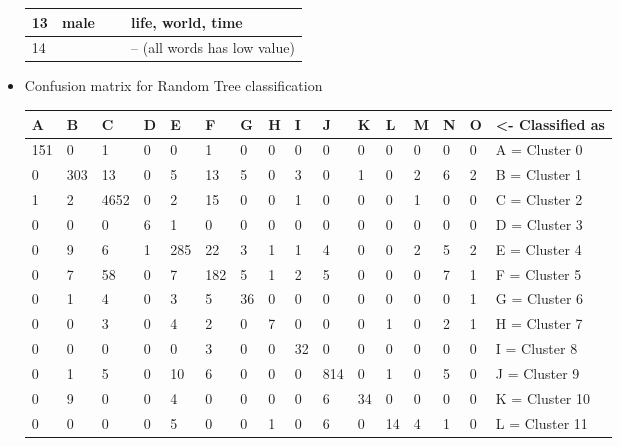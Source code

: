 \begin{itemize}
\begin{table}[H]
\begin{tabular}{|l|l|l|l|}
    13      & male   & ~                   & life,  world, time                             \\ \hline
    14      & ~      & ~                   & -- (all words has low value)                   \\ \hline
    \end{tabular}
	\end{table}
	\item Confusion matrix for Random Tree classification 
	\begin{table}[H]
    \begin{tabular}{|l|l|l|l|l|l|l|l|l|l|l|l|l|l|l|l|}
    \hline
    A   & B   & C    & D & E   & F   & G  & H & I  & J   & K  & L  & M  & N  & O   & <- Classified as \\ \hline
    151 & 0   & 1    & 0 & 0   & 1   & 0  & 0 & 0  & 0   & 0  & 0  & 0  & 0  & 0   & A = Cluster 0    \\ \hline
    0   & 303 & 13   & 0 & 5   & 13  & 5  & 0 & 3  & 0   & 1  & 0  & 2  & 6  & 2   & B = Cluster 1    \\ \hline
    1   & 2   & 4652 & 0 & 2   & 15  & 0  & 0 & 1  & 0   & 0  & 0  & 1  & 0  & 0   & C = Cluster 2    \\ \hline
    0   & 0   & 0    & 6 & 1   & 0   & 0  & 0 & 0  & 0   & 0  & 0  & 0  & 0  & 0   & D = Cluster 3    \\ \hline
    0   & 9   & 6    & 1 & 285 & 22  & 3  & 1 & 1  & 4   & 0  & 0  & 2  & 5  & 2   & E = Cluster 4    \\ \hline
    0   & 7   & 58   & 0 & 7   & 182 & 5  & 1 & 2  & 5   & 0  & 0  & 0  & 7  & 1   & F = Cluster 5    \\ \hline
    0   & 1   & 4    & 0 & 3   & 5   & 36 & 0 & 0  & 0   & 0  & 0  & 0  & 0  & 1   & G = Cluster 6    \\ \hline
    0   & 0   & 3    & 0 & 4   & 2   & 0  & 7 & 0  & 0   & 0  & 1  & 0  & 2  & 1   & H = Cluster 7    \\ \hline
    0   & 0   & 0    & 0 & 0   & 3   & 0  & 0 & 32 & 0   & 0  & 0  & 0  & 0  & 0   & I = Cluster 8    \\ \hline
    0   & 1   & 5    & 0 & 10  & 6   & 0  & 0 & 0  & 814 & 0  & 1  & 0  & 5  & 0   & J = Cluster 9    \\ \hline
    0   & 9   & 0    & 0 & 4   & 0   & 0  & 0 & 0  & 6   & 34 & 0  & 0  & 0  & 0   & K = Cluster 10   \\ \hline
    0   & 0   & 0    & 0 & 5   & 0   & 0  & 1 & 0  & 6   & 0  & 14 & 4  & 1  & 0   & L = Cluster 11   \\ \hline

\end{tabular}
\end{table}
\end{itemize}
